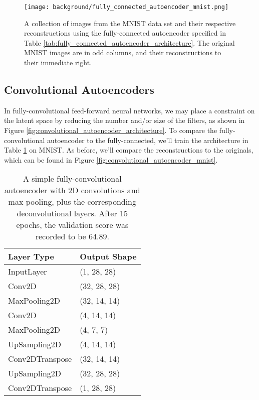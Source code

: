 \begin{figure}[h!]
\centering
\captionsetup{justification=centering}
\texttt{[image: background/fully\_connected\_autoencoder\_mnist.png]}
\caption{A collection of images from the MNIST data set and their respective reconstructions using the fully-connected autoencoder specified in Table \ref{tab:fully_connected_autoencoder_architecture}. The original MNIST images are in odd columns, and their reconstructions to their immediate right.}
\label{fig:fully_connected_autoencoder_mnist}
\end{figure}

\subsection{Convolutional Autoencoders}

In fully-convolutional feed-forward neural networks, we may place a constraint on the latent space by reducing the number and/or size of the filters, as shown in Figure \ref{fig:convolutional_autoencoder_architecture}. To compare the fully-convolutional autoencoder to the fully-connected, we'll train the architecture in Table \ref{tab:convolutional_autoencoder_architecture} on MNIST. As before, we'll compare the reconstructions to the originals, which can be found in Figure \ref{fig:convolutional_autoencoder_mnist}.

\begin{table}[h!]
\centering
\captionsetup{justification=centering}
\begin{tabular}{@{}ll@{}}
\toprule
\textbf{Layer Type} & \textbf{Output Shape} \\ \midrule
InputLayer & (1, 28, 28) \\
Conv2D & (32, 28, 28) \\
MaxPooling2D & (32, 14, 14) \\
Conv2D & (4, 14, 14) \\
MaxPooling2D & (4, 7, 7) \\
UpSampling2D & (4, 14, 14) \\
Conv2DTranspose & (32, 14, 14) \\
UpSampling2D & (32, 28, 28) \\
Conv2DTranspose & (1, 28, 28) \\ \bottomrule
\end{tabular}
\caption{A simple fully-convolutional autoencoder with 2D convolutions and max pooling, plus the corresponding deconvolutional layers. After 15 epochs, the validation score was recorded to be $64.89$.}
\label{tab:convolutional_autoencoder_architecture}
\end{table}

